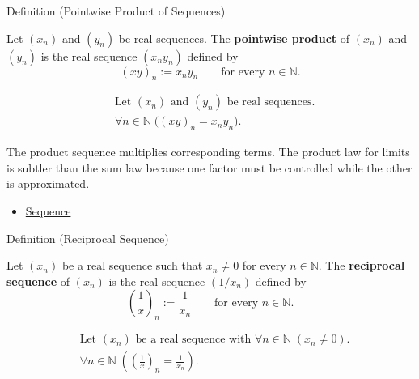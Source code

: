 \begin{definitionbox}{Definition (Pointwise Product of Sequences)}
\begin{definition}
\label{def:pointwise-product-sequence}
Let $(x_n)$ and $(y_n)$ be real sequences. The \textbf{pointwise product}
of $(x_n)$ and $(y_n)$ is the real sequence $(x_ny_n)$ defined by
\[
(xy)_n := x_ny_n
\qquad
\text{for every } n\in\mathbb{N}.
\]
\end{definition}
\end{definitionbox}

\begin{remark*}
\[
\begin{aligned}
&\text{Let } (x_n) \text{ and } (y_n) \text{ be real sequences.}\\
&\forall n\in\mathbb{N}\;\bigl((xy)_n=x_ny_n\bigr).
\end{aligned}
\]
\end{remark*}

\begin{remark*}[Interpretation]
The product sequence multiplies corresponding terms. The product law for
limits is subtler than the sum law because one factor must be controlled while
the other is approximated.
\end{remark*}

\begin{dependencies}
\begin{itemize}
  \item \hyperref[def:sequence]{Sequence}
\end{itemize}
\end{dependencies}


\begin{definitionbox}{Definition (Reciprocal Sequence)}
\begin{definition}
\label{def:reciprocal-sequence}
Let $(x_n)$ be a real sequence such that $x_n\neq 0$ for every
$n\in\mathbb{N}$. The \textbf{reciprocal sequence} of $(x_n)$ is the real
sequence $(1/x_n)$ defined by
\[
\left(\frac{1}{x}\right)_n := \frac{1}{x_n}
\qquad
\text{for every } n\in\mathbb{N}.
\]
\end{definition}
\end{definitionbox}

\begin{remark*}
\[
\begin{aligned}
&\text{Let } (x_n) \text{ be a real sequence with }
  \forall n\in\mathbb{N}\;(x_n\neq 0).\\
&\forall n\in\mathbb{N}\;
\left(\left(\frac{1}{x}\right)_n=\frac{1}{x_n}\right).
\end{aligned}
\]
\end{remark*}

